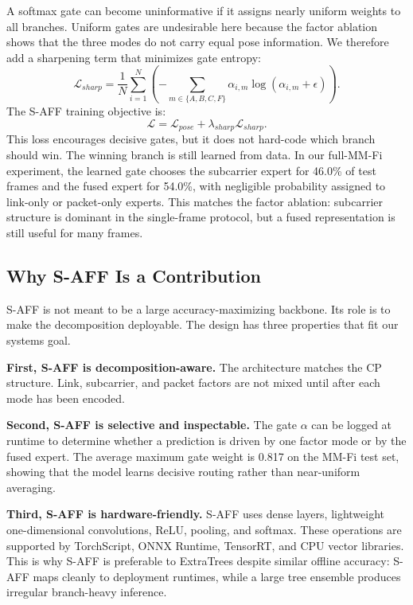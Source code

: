 \documentclass[10pt,conference]{IEEEtran}
\begin{document}
A softmax gate can become uninformative if it assigns nearly uniform weights to all branches. Uniform gates are undesirable here because the factor ablation shows that the three modes do not carry equal pose information. We therefore add a sharpening term that minimizes gate entropy:
\begin{equation}
\mathcal{L}_{sharp}
=
\frac{1}{N}\sum_{i=1}^{N}
\left(
-\sum_{m\in\{A,B,C,F\}}
\alpha_{i,m}\log(\alpha_{i,m}+\epsilon)
\right).
\end{equation}
The S-AFF training objective is:
\begin{equation}
\mathcal{L}
=
\mathcal{L}_{pose}
+\lambda_{sharp}\mathcal{L}_{sharp}.
\end{equation}
This loss encourages decisive gates, but it does not hard-code which branch should win. The winning branch is still learned from data. In our full-MM-Fi experiment, the learned gate chooses the subcarrier expert for 46.0\% of test frames and the fused expert for 54.0\%, with negligible probability assigned to link-only or packet-only experts. This matches the factor ablation: subcarrier structure is dominant in the single-frame protocol, but a fused representation is still useful for many frames.

\subsection{Why S-AFF Is a Contribution}

S-AFF is not meant to be a large accuracy-maximizing backbone. Its role is to make the decomposition deployable. The design has three properties that fit our systems goal.

\textbf{First, S-AFF is decomposition-aware.}
The architecture matches the CP structure. Link, subcarrier, and packet factors are not mixed until after each mode has been encoded.

\textbf{Second, S-AFF is selective and inspectable.}
The gate $\alpha$ can be logged at runtime to determine whether a prediction is driven by one factor mode or by the fused expert. The average maximum gate weight is 0.817 on the MM-Fi test set, showing that the model learns decisive routing rather than near-uniform averaging.

\textbf{Third, S-AFF is hardware-friendly.}
S-AFF uses dense layers, lightweight one-dimensional convolutions, ReLU, pooling, and softmax. These operations are supported by TorchScript, ONNX Runtime, TensorRT, and CPU vector libraries. This is why S-AFF is preferable to ExtraTrees despite similar offline accuracy: S-AFF maps cleanly to deployment runtimes, while a large tree ensemble produces irregular branch-heavy inference.
\end{document}
